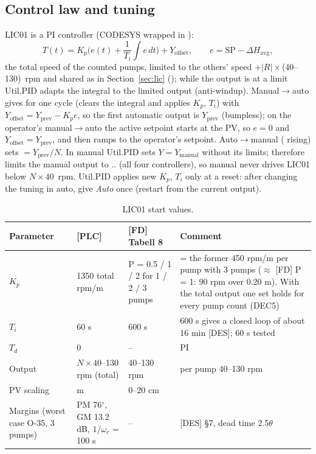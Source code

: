 \documentclass[11pt,a4paper]{article}
\begin{document}
\subsection{Control law and tuning}
LIC01 is a PI controller (CODESYS  wrapped in ):
\[
T(t) = K_p\Big(e(t) + \frac{1}{T_i}\int e\,dt\Big) + Y_\text{offset}, \qquad e = \mathrm{SP} - \Delta H_\text{avg},
\]
the total speed of the counted pumps, limited to the others' speed $+ |R|\times$(40--130)~rpm and shared as
in Section~\ref{sec:lic} (); while the output is at a limit Util.PID adapts the integral to the limited output
(anti-windup). Manual$\to$auto gives  for one cycle (clears the integral and applies $K_p$,
$T_i$) with $Y_\text{offset} = Y_\text{prev} - K_p e$, so the first automatic output is $Y_\text{prev}$
(bumpless); on the operator's manual$\to$auto the active setpoint starts at the PV, so $e = 0$ and
$Y_\text{offset} = Y_\text{prev}$, and then ramps to the operator's setpoint. Auto$\to$manual ( rising) sets
 $= Y_\text{prev}/N$. In manual Util.PID sets
$Y = Y_\text{manual}$ without its limits;  therefore limits the manual output to
.. (all four controllers), so manual never drives LIC01 below
$N\times40$~rpm. Util.PID applies new $K_p$, $T_i$ only
at a reset: after changing the tuning in auto, give \emph{Auto} once (restart from the current output).

\begin{table}[htbp]
\centering\small
\caption{LIC01 start values.}
\label{tab:tuning}
\begin{tabularx}{\textwidth}{@{}lP{24mm}P{30mm}L@{}}
\toprule
Parameter & [PLC] & [FD] Tabell 8 & Comment \\
\midrule
$K_p$ & 1350 total rpm/m & P = 0.5 / 1 / 2 for 1 / 2 / 3 pumps & = the former 450 rpm/m per pump with 3 pumps ($\approx$ [FD] P = 1: 90 rpm over 0.20 m). With the total output one set holds for every pump count (DEC5) \\
$T_i$ & 60 s & 600 s & 600 s gives a closed loop of about 16 min [DES]; 60 s tested \\
$T_d$ & 0 & -- & PI \\
Output & $N\times$40--130 rpm (total) & 40--130 rpm & per pump 40--130 rpm \\
PV scaling & m & 0--20 cm & \\
Margins (worst case O-35, 3 pumps) & PM 76$^\circ$, GM 13.2 dB, $1/\omega_c$ = 100 s & -- & [DES] \S7, dead time 2.5$\theta$ \\
\bottomrule
\end{tabularx}
\end{table}
\end{document}
